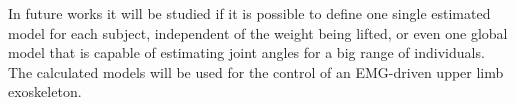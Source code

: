 \documentclass[letterpaper, 10 pt, conference]{ieeeconf}  %
\begin{document}
In future works it will be studied if it is possible to define one single estimated model for each subject, independent of the weight being lifted, or even one global model that is capable of estimating joint angles for a big range of individuals. The calculated models will be used for the control of an EMG-driven upper limb exoskeleton.

















\end{document}
